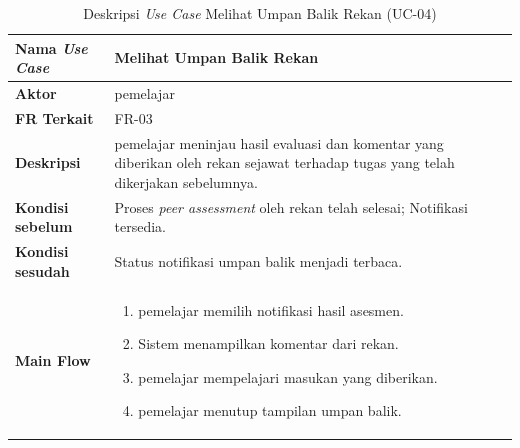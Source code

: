 \begin{table}[H]
    \centering
    \caption{Deskripsi \textit{Use Case} Melihat Umpan Balik Rekan (UC-04)}
    \label{tbl:desc_uc04}
    \begin{tabular}{|p{}|p{}|}
        \hline
        \textbf{Nama \textit{Use Case}} & \textbf{Melihat Umpan Balik Rekan} \\
        \hline
        \textbf{Aktor} & pemelajar \\
        \hline
        \textbf{FR Terkait} & FR-03 \\
        \hline
        \textbf{Deskripsi} & pemelajar meninjau hasil evaluasi dan komentar yang diberikan oleh rekan sejawat terhadap tugas yang telah dikerjakan sebelumnya. \\
        \hline
        \textbf{Kondisi sebelum} & Proses \textit{peer assessment} oleh rekan telah selesai; Notifikasi tersedia. \\
        \hline
        \textbf{Kondisi sesudah} & Status notifikasi umpan balik menjadi terbaca. \\
        \hline
        \textbf{Main Flow} & \begin{enumerate}[noitemsep,topsep=0pt,leftmargin=*]
            \item pemelajar memilih notifikasi hasil asesmen.
            \item Sistem menampilkan komentar dari rekan.
            \item pemelajar mempelajari masukan yang diberikan.
            \item pemelajar menutup tampilan umpan balik.
        \end{enumerate} \\
        \hline
    \end{tabular}
\end{table}